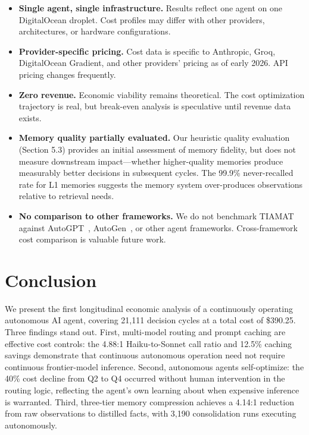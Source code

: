\documentclass[11pt,a4paper]{article}
\begin{document}
\begin{itemize}
    \item \textbf{Single agent, single infrastructure.} Results reflect one agent on one DigitalOcean droplet. Cost profiles may differ with other providers, architectures, or hardware configurations.
    \item \textbf{Provider-specific pricing.} Cost data is specific to Anthropic, Groq, DigitalOcean Gradient, and other providers' pricing as of early 2026. API pricing changes frequently.
    \item \textbf{Zero revenue.} Economic viability remains theoretical. The cost optimization trajectory is real, but break-even analysis is speculative until revenue data exists.
    \item \textbf{Memory quality partially evaluated.} Our heuristic quality evaluation (Section 5.3) provides an initial assessment of memory fidelity, but does not measure downstream impact---whether higher-quality memories produce measurably better decisions in subsequent cycles. The 99.9\% never-recalled rate for L1 memories suggests the memory system over-produces observations relative to retrieval needs.
    \item \textbf{No comparison to other frameworks.} We do not benchmark TIAMAT against AutoGPT~\citep{significant2023autogpt}, AutoGen~\citep{wu2023autogen}, or other agent frameworks. Cross-framework cost comparison is valuable future work.
\end{itemize}

\section{Conclusion}
\label{sec:conclusion}

We present the first longitudinal economic analysis of a continuously operating autonomous AI agent, covering 21,111 decision cycles at a total cost of \$390.25. Three findings stand out. First, multi-model routing and prompt caching are effective cost controls: the 4.88:1 Haiku-to-Sonnet call ratio and 12.5\% caching savings demonstrate that continuous autonomous operation need not require continuous frontier-model inference. Second, autonomous agents self-optimize: the 40\% cost decline from Q2 to Q4 occurred without human intervention in the routing logic, reflecting the agent's own learning about when expensive inference is warranted. Third, three-tier memory compression achieves a 4.14:1 reduction from raw observations to distilled facts, with 3,190 consolidation runs executing autonomously.
\end{document}
